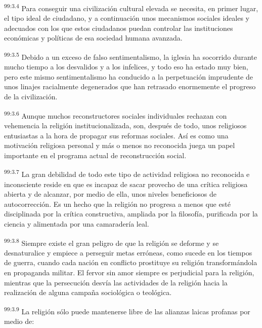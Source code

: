 \par
\textsuperscript{99:3.4} Para conseguir una civilización cultural elevada se necesita, en primer lugar, el tipo ideal de ciudadano, y a continuación unos mecanismos sociales ideales y adecuados con los que estos ciudadanos puedan controlar las instituciones económicas y políticas de esa sociedad humana avanzada.

\par
\textsuperscript{99:3.5} Debido a un exceso de falso sentimentalismo, la iglesia ha socorrido durante mucho tiempo a los desvalidos y a los infelices, y todo eso ha estado muy bien, pero este mismo sentimentalismo ha conducido a la perpetuación imprudente de unos linajes racialmente degenerados que han retrasado enormemente el progreso de la civilización.

\par
\textsuperscript{99:3.6} Aunque muchos reconstructores sociales individuales rechazan con vehemencia la religión institucionalizada, son, después de todo, unos religiosos entusiastas a la hora de propagar sus reformas sociales. Así es como una motivación religiosa personal y más o menos no reconocida juega un papel importante en el programa actual de reconstrucción social.

\par
\textsuperscript{99:3.7} La gran debilidad de todo este tipo de actividad religiosa no reconocida e inconsciente reside en que es incapaz de sacar provecho de una crítica religiosa abierta y de alcanzar, por medio de ella, unos niveles beneficiosos de autocorrección. Es un hecho que la religión no progresa a menos que esté disciplinada por la crítica constructiva, ampliada por la filosofía, purificada por la ciencia y alimentada por una camaradería leal.

\par
\textsuperscript{99:3.8} Siempre existe el gran peligro de que la religión se deforme y se desnaturalice y empiece a perseguir metas erróneas, como sucede en los tiempos de guerra, cuando cada nación en conflicto prostituye su religión transformándola en propaganda militar. El fervor sin amor siempre es perjudicial para la religión, mientras que la persecución desvía las actividades de la religión hacia la realización de alguna campaña sociológica o teológica.

\par
\textsuperscript{99:3.9} La religión sólo puede mantenerse libre de las alianzas laicas profanas por medio de:

